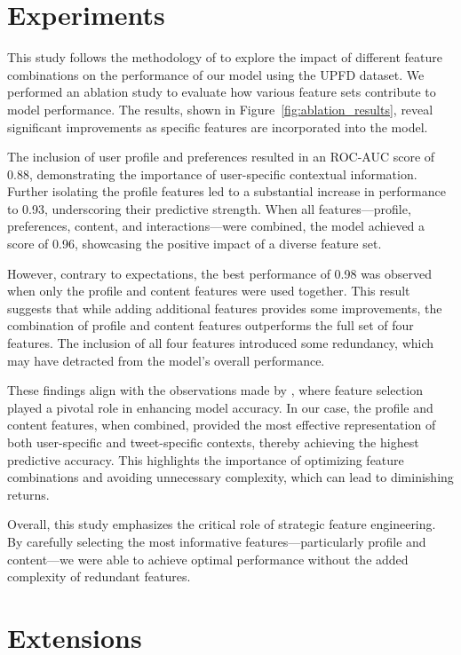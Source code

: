 \documentclass[sigconf,nonacm]{acmart}
\begin{document}
\section{Experiments}


This study follows the methodology of \cite{monti2019fakenewsdetectionsocial} to explore the impact of different feature combinations on the performance of our model using the UPFD dataset. We performed an ablation study to evaluate how various feature sets contribute to model performance. The results, shown in Figure~\ref{fig:ablation_results}, reveal significant improvements as specific features are incorporated into the model.

The inclusion of user profile and preferences resulted in an ROC-AUC score of 0.88, demonstrating the importance of user-specific contextual information. Further isolating the profile features led to a substantial increase in performance to 0.93, underscoring their predictive strength. When all features—profile, preferences, content, and interactions—were combined, the model achieved a score of 0.96, showcasing the positive impact of a diverse feature set.

However, contrary to expectations, the best performance of 0.98 was observed when only the profile and content features were used together. This result suggests that while adding additional features provides some improvements, the combination of profile and content features outperforms the full set of four features. The inclusion of all four features introduced some redundancy, which may have detracted from the model’s overall performance. 

These findings align with the observations made by \cite{monti2019fakenewsdetectionsocial}, where feature selection played a pivotal role in enhancing model accuracy. In our case, the profile and content features, when combined, provided the most effective representation of both user-specific and tweet-specific contexts, thereby achieving the highest predictive accuracy. This highlights the importance of optimizing feature combinations and avoiding unnecessary complexity, which can lead to diminishing returns. 

Overall, this study emphasizes the critical role of strategic feature engineering. By carefully selecting the most informative features—particularly profile and content—we were able to achieve optimal performance without the added complexity of redundant features.

\section{Extensions}
\end{document}
